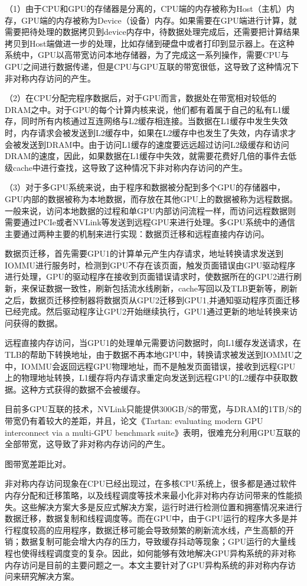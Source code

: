 \documentclass{cjc}
\begin{document}
（1）由于CPU和GPU的存储器是分离的，CPU端的内存被称为Host（主机）内存，GPU端的内存被称为Device（设备）内存。如果需要在GPU端进行计算，就需要把待处理的数据拷贝到device内存中，待数据处理完成后，还需要把计算结果拷贝到Host端做进一步的处理，比如存储到硬盘中或者打印到显示器上。在这种系统中，GPU以高带宽访问本地存储器，为了完成这一系列操作，需要CPU与GPU之间进行数据传递，但是CPU与GPU互联的带宽很低，这导致了这种情况下非对称内存访问的产生。

（2）在CPU分配完程序数据后，对于GPU而言，数据处在带宽相对较低的DRAM之中。对于GPU的每个计算内核来说，他们都有着属于自己的私有L1缓存，同时所有内核通过互连网络与L2缓存相连接。当数据在L1缓存中发生失效时，内存请求会被发送到L2缓存中，如果在L2缓存中也发生了失效，内存请求才会被发送到DRAM中。由于访问L1缓存的速度要远远超过访问L2级缓存和访问DRAM的速度，因此，如果数据在L1缓存中失效，就需要花费好几倍的事件去低级cache中进行查找，这导致了这种情况下非对称内存访问的产生。

（3）对于多GPU系统来说，由于程序和数据被分配到多个GPU的存储器中，GPU内部的数据被称为本地数据，而存放在其他GPU上的数据被称为远程数据。一般来说，访问本地数据的过程和单GPU内部访问流程一样，而访问远程数据则需要通过PCIe或者NVLink等发送到远程GPU来进行处理。多GPU系统中的通信主要通过两种主要的机制来进行实现：数据页迁移和远程直接内存访问。

数据页迁移，首先需要GPU1的计算单元产生内存请求，地址转换请求发送到IOMMU进行服务时，检测到GPU不存在该页面，触发页面错误由GPU驱动程序进行处理，GPU的驱动程序在接收到页面错误请求时，使数据所在的GPU2进行刷新，来保证数据一致性，刷新包括流水线刷新，cache写回以及TLB更新等，刷新之后，数据页迁移控制器将数据页从GPU2迁移到GPU1,并通知驱动程序页面迁移已经完成。然后驱动程序让GPU2开始继续执行，GPU1通过更新的地址转换来访问获得的数据。

远程直接内存访问，当GPU1的处理单元需要访问数据时，向L1缓存发送请求，在TLB的帮助下转换地址，由于数据不再本地GPU中，转换请求被发送到IOMMU之中，IOMMU会返回远程GPU物理地址，而不是触发页面错误，接收到远程GPU上的物理地址转换，L1缓存将内存请求重定向发送到远程GPU的L2缓存中获取数据。这种方式获得的数据不会被缓存。

目前多GPU互联的技术，NVLink只能提供300GB/S的带宽，与DRAM的1TB/S的带宽仍有着较大的差距，并且，论文《Tartan: evaluating modern GPU interconnect via a multi-GPU benchmark suite》表明，很难充分利用GPU互联的全部带宽，这导致了非对称内存访问的产生。

图带宽差距比对。

非对称内存访问现象在CPU已经出现过，在多核CPU系统上，很多都是通过软件内存分配和迁移策略，以及线程调度等技术来最小化非对称内存访问带来的性能损失。这些解决方案大多是反应式解决方案，运行时进行检测位置和拥塞情况来进行数据迁移，数据复制和线程调度等。而在GPU中，由于GPU运行的程序大多是并行程度较高的应用程序，数据迁移可能会导致频繁的刷新流水线，产生高额的开销；数据复制可能会增大内存的压力，导致缓存抖动等现象；GPU运行的大量线程也使得线程调度变的复杂。因此，如何能够有效地解决GPU异构系统的非对称内存访问是目前的主要问题之一。本文主要针对了GPU异构系统的非对称内存访问来研究解决方案。
\end{document}
